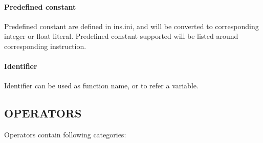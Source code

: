 \documentclass{article}
\begin{document}
\paragraph{Predefined constant} Predefined constant are defined in ins.ini, and will be converted to corresponding integer or float literal. Predefined constant supported will be listed around corresponding instruction.

\paragraph{Identifier} Identifier can be used as function name, or to refer a variable.%

\subsection{OPERATORS}

Operators contain following categories:
\end{document}
